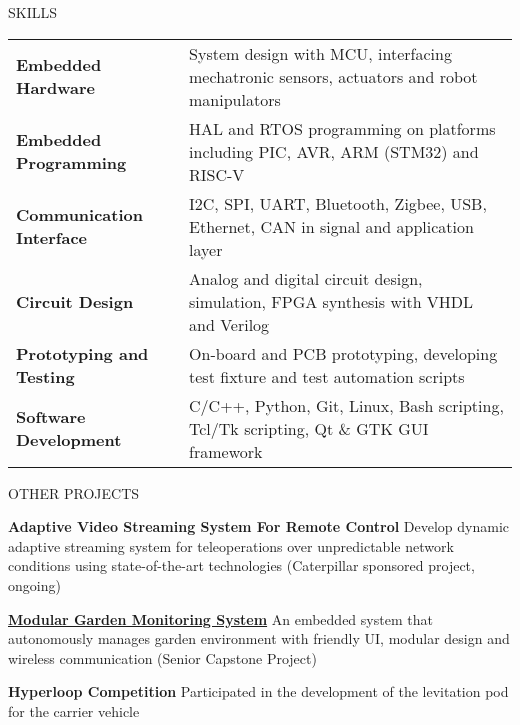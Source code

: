 \documentclass{lib/resume} %
\begin{document}
\begin{rSection}{SKILLS}

    \begin{tabular}{ @{} >{\bfseries}l @{\hspace{2ex}} l }
        Embedded Hardware       & System design with MCU, interfacing mechatronic sensors, actuators and robot manipulators \\
        Embedded Programming    & HAL and RTOS programming on platforms including PIC, AVR, ARM (STM32) and RISC-V  \\
        Communication Interface & I2C, SPI, UART, Bluetooth, Zigbee, USB, Ethernet, CAN in signal and application layer \\
        Circuit Design          & Analog and digital circuit design, simulation, FPGA synthesis with VHDL and Verilog  \\
        Prototyping and Testing & On-board and PCB prototyping, developing test
        fixture and test automation scripts \\
        Software Development    & C/C++, Python, Git, Linux, Bash scripting, Tcl/Tk scripting, Qt \& GTK GUI framework \\
    \end{tabular}
\end{rSection}

\begin{rSection}{OTHER PROJECTS}
    \vspace{-1em}
    \item {\textbf{Adaptive Video Streaming System For Remote Control}} {Develop dynamic adaptive streaming system for teleoperations over unpredictable network conditions using state-of-the-art technologies (Caterpillar sponsored project, ongoing)}
    \item \href{https://github.com/liu2g/mgms}{\textbf{Modular Garden Monitoring System}} {An embedded system that autonomously manages garden environment with friendly UI, modular design and wireless communication (Senior Capstone Project)}
    \item \textbf{Hyperloop Competition} {Participated in the development of the levitation pod for the carrier vehicle}

\end{rSection}

%
%
%
%
%
\end{document}
